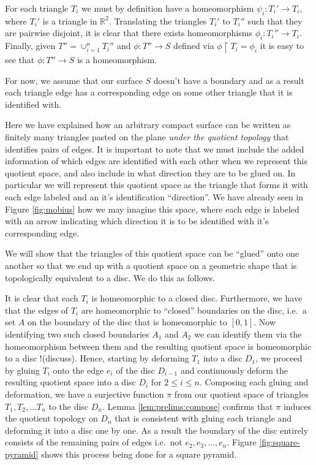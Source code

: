 For each triangle $T_i$ we must by definition have a homeomorphism
$\psi_i: T_i' \rightarrow T_i$, where $T_i'$ is a triangle in
$\mathbb{R}^2$. Translating the triangles $T_i'$ to $T_i''$ such that
they are pairwise disjoint, it is clear that there exists
homeomorphisms $\phi_i: T_i'' \rightarrow T_i$. Finally, given $T'' =
\cup_{i=1}^n T_i''$ and $\phi : T'' \rightarrow S$ defined via $\phi
\restriction T_i = \phi_i$ it is easy to see that $\phi : T''
\rightarrow S$ is a homeomorphism. 

For now, we assume that our surface $S$ doesn't have a
boundary and as a result each triangle edge has a corresponding edge %
on some other triangle that it is identified with.

Here we have explained how an arbitrary compact surface can be written
as finitely many triangles pasted on the plane \emph{under the
  quotient topology} that identifies pairs of edges. It is important
to note that we must include the added information of which edges are
identified with each other when we represent this quotient space, and
also include in what direction they are to be glued on. In 
particular we will represent this quotient space as the triangle that
forms it with each edge labeled and an it's identification
``direction''. We have already seen in Figure \ref{fig:mobius} how we
may imagine this space, where each edge is labeled with an arrow
indicating which direction it is to be identified with it's
corresponding edge.

We will show that the triangles of this quotient space can be
``glued'' onto one another so that we end up with a quotient space on
a geometric shape that is topologically equivalent to a disc. We do
this as follows.

It is clear that each $T_i$ is homeomorphic to a closed
disc. Furthermore, we have that the edges of $T_i$ are homeomorphic to
``closed'' boundaries on the disc, i.e.\ a set $A$ on the boundary of 
the disc that is homeomorphic to $[0,1]$. Now identifying two such
closed boundaries $A_1$ and $A_2$ we can identify them via the
homeomorphism between them and the resulting quotient space is
homeomorphic to a disc !(discuss). Hence, starting by deforming $T_1$
into a disc $D_1$, we proceed by gluing $T_i$ onto the edge $e_i$ of
the disc $D_{i-1}$ and continuously deform the resulting quotient
space into a disc $D_i$ for $2 \leq i \leq n$. Composing each gluing
and deformation, we have a surjective function $\pi$ from our quotient
space of triangles $T_1, T_2, \dots T_n$ to the disc $D_n$. Lemma
\ref{lem:prelims:compose} confirms that $\pi$ induces the quotient
topology on $D_n$ that is consistent with gluing each triangle and
deforming it into a disc one by one. As a result the boundary of the
disc entirely consists of the remaining pairs of edges i.e.\ not $e_2,
e_3, \dots, e_n$. Figure \ref{fig:square-pyramid} shows this process
being done for a square pyramid.

